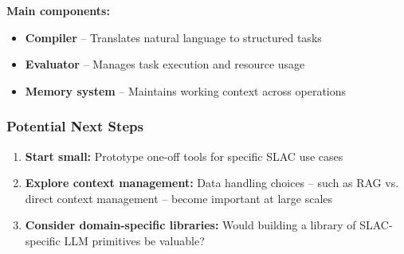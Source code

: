 \documentclass{beamer}
\begin{document}
\begin{frame}
\vspace{0.2cm}
\textbf{Main components:}
\begin{itemize}\setlength{\itemsep}{0pt}
    \item \textbf{Compiler} – Translates natural language to structured tasks
    \item \textbf{Evaluator} – Manages task execution and resource usage
    \item \textbf{Memory system} – Maintains working context across operations
\end{itemize}

\end{frame}

\begin{frame}
\frametitle{Potential Next Steps}

\begin{enumerate}
\item \textbf{Start small:} Prototype one-off tools for specific SLAC use cases
\item \textbf{Explore context management:} Data handling choices -- such as RAG vs. direct context management -- become important at large scales
\item \textbf{Consider domain-specific libraries:} Would building a library of SLAC-specific LLM primitives be valuable?
\end{enumerate}

\vspace{0.5cm}
\centering
\end{frame}
\end{document}
